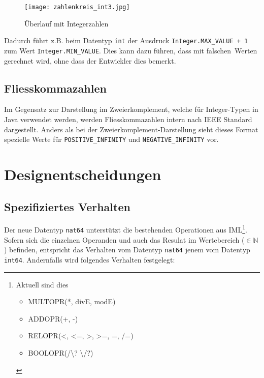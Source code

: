 \documentclass[10pt, a4paper, twocolumn]{article} %
\begin{document}
\begin{figure}[H]
    \texttt{[image: zahlenkreis\_int3.jpg]} %
    \caption{Überlauf mit Integerzahlen } %
    \label{zahlenkreis}
\end{figure}


Dadurch führt z.B. beim Datentyp \texttt{int} der Ausdruck \texttt{Integer.MAX\_VALUE + 1} zum Wert \texttt{Integer.MIN\_VALUE}.
Dies kann dazu führen, dass mit \glqq falschen\grqq \ Werten gerechnet wird, ohne dass der Entwickler dies bemerkt.

\subsection{Fliesskommazahlen}
Im Gegensatz zur Darstellung im Zweierkomplement, welche für Integer-Typen in Java verwendet werden, werden Fliesskommazahlen intern nach IEEE Standard dargestellt.
Anders als bei der Zweierkomplement-Darstellung sieht dieses Format spezielle Werte für \texttt{POSITIVE\_INFINITY} und \texttt{NEGATIVE\_INFINITY} vor.

\section{Designentscheidungen}
\subsection{Spezifiziertes Verhalten}
Der neue Datentyp \texttt{nat64} unterstützt die bestehenden Operationen aus IML\footnote{Aktuell sind dies \begin{itemize}
                                                                                                                \item MULTOPR(*, divE, modE) \item ADDOPR(+, -) \item RELOPR(<, <=, >, >=, =, /=) \item BOOLOPR(/\textbackslash? \textbackslash/?)
\end{itemize}}.
Sofern sich die einzelnen Operanden und auch das Resulat im Wertebereich ($\in \mathbb{N}$) befinden, %
entspricht das Verhalten vom Datentyp \texttt{nat64} jenem vom Datentyp \texttt{int64}.
Andernfalls wird folgendes Verhalten festgelegt:
\end{document}
